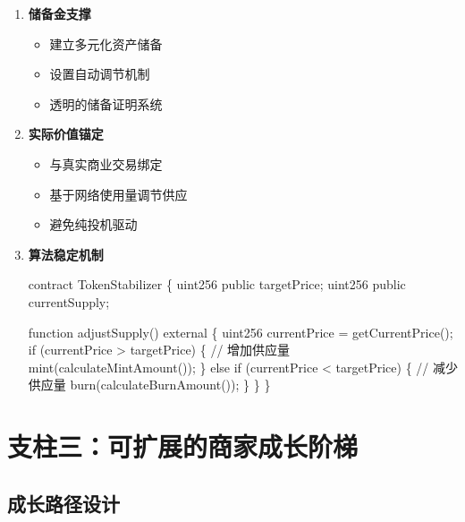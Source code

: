 \documentclass[
  Letterpaper,
]{scrbook}
\newenvironment{Shaded}{\begin{snugshade}}{\end{snugshade}}
\newcommand{\NormalTok}[1]{\textcolor[rgb]{0.00,0.23,0.31}{#1}}
\providecommand{\tightlist}{%
  \setlength{\itemsep}{0pt}\setlength{\parskip}{0pt}}
\begin{document}
\begin{enumerate}
\def\labelenumi{\arabic{enumi}.}
\item
  \textbf{储备金支撑}

  \begin{itemize}
  \tightlist
  \item
    建立多元化资产储备
  \item
    设置自动调节机制
  \item
    透明的储备证明系统
  \end{itemize}
\item
  \textbf{实际价值锚定}

  \begin{itemize}
  \tightlist
  \item
    与真实商业交易绑定
  \item
    基于网络使用量调节供应
  \item
    避免纯投机驱动
  \end{itemize}
\item
  \textbf{算法稳定机制}

\begin{Shaded}
\begin{Highlighting}[]
\NormalTok{contract TokenStabilizer \{}
\NormalTok{    uint256 public targetPrice;}
\NormalTok{    uint256 public currentSupply;}

\NormalTok{    function adjustSupply() external \{}
\NormalTok{        uint256 currentPrice = getCurrentPrice();}
\NormalTok{        if (currentPrice \textgreater{} targetPrice) \{}
\NormalTok{            // 增加供应量}
\NormalTok{            mint(calculateMintAmount());}
\NormalTok{        \} else if (currentPrice \textless{} targetPrice) \{}
\NormalTok{            // 减少供应量}
\NormalTok{            burn(calculateBurnAmount());}
\NormalTok{        \}}
\NormalTok{    \}}
\NormalTok{\}}
\end{Highlighting}
\end{Shaded}
\end{enumerate}

\section{支柱三：可扩展的商家成长阶梯}\label{ux652fux67f1ux4e09ux53efux6269ux5c55ux7684ux5546ux5bb6ux6210ux957fux9636ux68af}

\subsection{成长路径设计}\label{ux6210ux957fux8defux5f84ux8bbeux8ba1}
\end{document}
